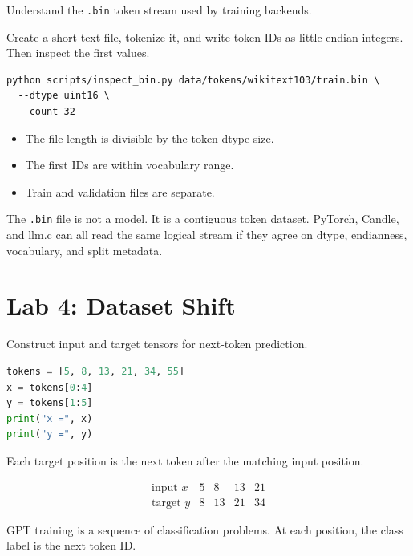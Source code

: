  Understand the \texttt{.bin} token stream used by training backends.


Create a short text file, tokenize it, and write token IDs as little-endian integers. Then inspect the first values.

\begin{lstlisting}
python scripts/inspect_bin.py data/tokens/wikitext103/train.bin \
  --dtype uint16 \
  --count 32
\end{lstlisting}


\begin{itemize}
  \item The file length is divisible by the token dtype size.
  \item The first IDs are within vocabulary range.
  \item Train and validation files are separate.
\end{itemize}

 The \texttt{.bin} file is not a model. It is a contiguous token dataset. PyTorch, Candle, and llm.c can all read the same logical stream if they agree on dtype, endianness, vocabulary, and split metadata.

\section{Lab 4: Dataset Shift}

 Construct input and target tensors for next-token prediction.

\term{Procedure.}

\begin{lstlisting}[language=Python]
tokens = [5, 8, 13, 21, 34, 55]
x = tokens[0:4]
y = tokens[1:5]
print("x =", x)
print("y =", y)
\end{lstlisting}

 Each target position is the next token after the matching input position.

\[
\begin{array}{c|cccc}
\text{input } x & 5 & 8 & 13 & 21\\
\hline
\text{target } y & 8 & 13 & 21 & 34
\end{array}
\]

 GPT training is a sequence of classification problems. At each position, the class label is the next token ID.

